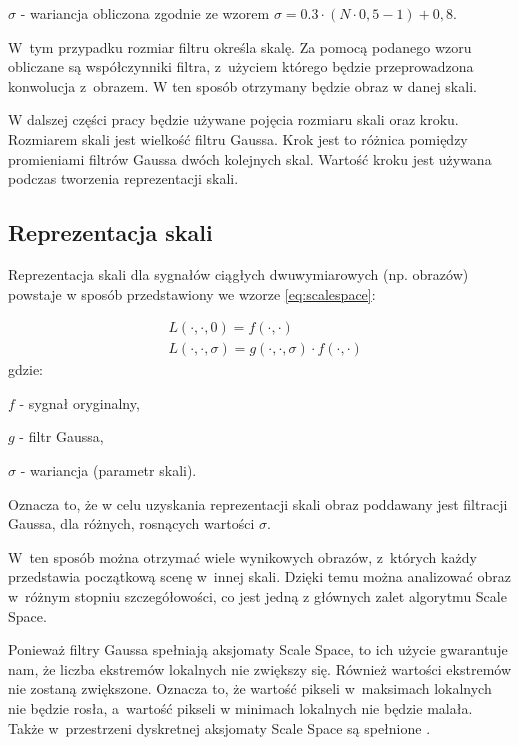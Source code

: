 $ \sigma $ - wariancja obliczona zgodnie ze wzorem $ \sigma = 0.3 \cdot (N \cdot 0,5 - 1) + 0,8$.

W~tym przypadku rozmiar filtru określa skalę. Za pomocą podanego wzoru obliczane są współczynniki filtra, z~użyciem którego będzie przeprowadzona konwolucja z~obrazem. W ten sposób otrzymany będzie obraz w danej skali.

W dalszej części pracy będzie używane pojęcia rozmiaru skali oraz kroku. Rozmiarem skali jest wielkość filtru Gaussa. Krok jest to różnica pomiędzy promieniami filtrów Gaussa dwóch kolejnych skal. Wartość kroku jest używana podczas tworzenia reprezentacji skali.

\subsection{Reprezentacja skali}
\label{subsec:reprezentacjaskali}
Reprezentacja skali dla sygnałów ciągłych dwuwymiarowych (np. obrazów) powstaje w sposób przedstawiony we wzorze \eqref{eq:scalespace}:

\begin{equation}
\label{eq:scalespace}
\begin{split}
& L(\cdot,\cdot,0) = f(\cdot,\cdot) \\
& L(\cdot,\cdot,\sigma) = g(\cdot,\cdot,\sigma)\cdot f(\cdot,\cdot)
\end{split}
\end{equation}
gdzie:

$ f $ - sygnał oryginalny,

$ g $ - filtr Gaussa, 

$ \sigma $ - wariancja (parametr skali).

Oznacza to, że w celu uzyskania reprezentacji skali obraz poddawany jest filtracji Gaussa, dla różnych, rosnących wartości $ \sigma $.

W~ten sposób można otrzymać wiele wynikowych obrazów, z~których każdy przedstawia początkową scenę w~innej skali. Dzięki temu można analizować obraz w~różnym stopniu szczegółowości, co jest jedną z głównych zalet algorytmu Scale Space.

Ponieważ filtry Gaussa spełniają aksjomaty Scale Space, to ich użycie gwarantuje nam, że liczba ekstremów lokalnych nie zwiększy się. Również wartości ekstremów nie zostaną zwiększone. Oznacza to, że wartość pikseli w~maksimach lokalnych nie będzie rosła, a~wartość pikseli w minimach lokalnych nie będzie malała. Także w~przestrzeni dyskretnej aksjomaty Scale Space są spełnione \cite{SSFDS}.

